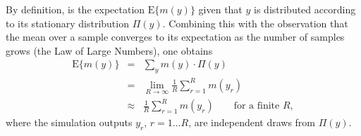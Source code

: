 By definition,  is the expectation $\text{E}\{m(y)\}$
given that $y$ is distributed according to its stationary distribution
$\Pi(y)$. Combining this with the observation that the mean over
a sample converges to its expectation as the number of samples grows
(the Law of Large Numbers), one obtains
\begin{eqnarray}
\text{E}\{m(y)\} & = & \sum_{y}m(y)\cdot\Pi(y)\label{eq:define-question}\\
 & = & \lim_{R\rightarrow\infty}\frac{1}{R}\sum_{r=1}^{R}m(y_{r})\\
 & \approx & \frac{1}{R}\sum_{r=1}^{R}m(y_{r})\qquad\text{for a finite }R,\label{eq:approximate-answer}
\end{eqnarray}
where the simulation outputs $y_{r}$, $r=1\ldots R$, are independent
draws from $\Pi(y)$.

